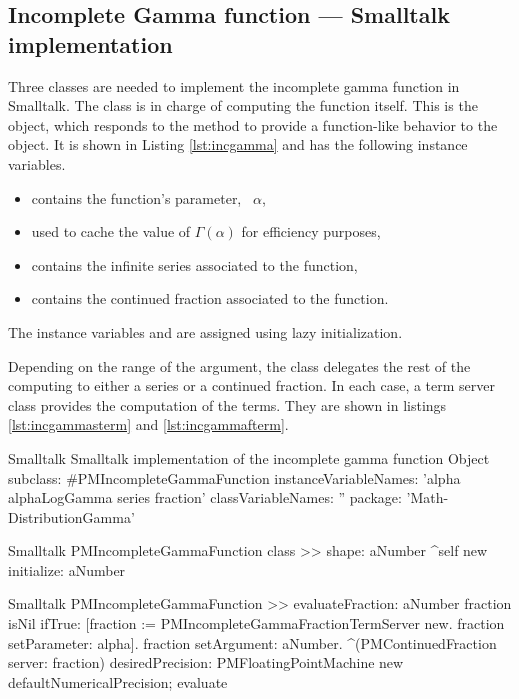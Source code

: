 \subsection{Incomplete Gamma function --- Smalltalk  implementation}
\label{sec:sincgamma}
Three classes are needed to implement the incomplete gamma function in Smalltalk.
The class  is in charge of
computing the function itself. This is the object, which responds
to the method  to provide a function-like behavior to
the object. It is shown in Listing \ref{lst:incgamma} and has the
following instance variables.
\begin{itemize}
\item {} contains the function's parameter, \ie\ $\alpha$,
\item {} used to cache the value of $\Gamma\left(\alpha\right)$ for efficiency
purposes,
\item {} contains the infinite series associated to the function,
\item {} contains the continued fraction  associated to the
function.
\end{itemize}
The instance variables  and  are
assigned using lazy initialization.

Depending on the range of the argument, the class delegates the
rest of the computing to either a series or a continued fraction.
In each case, a term server class provides the computation of the
terms.
They are shown in listings \ref{lst:incgammasterm} and \ref{lst:incgammafterm}.

\begin{listing}[label=lst:incgamma]{Smalltalk}
{Smalltalk implementation of the incomplete gamma function}
Object subclass: #PMIncompleteGammaFunction
   instanceVariableNames: 'alpha alphaLogGamma series fraction'
   classVariableNames: ''
   package: 'Math-DistributionGamma'
\end{listing}

\begin{displaycode}{Smalltalk}
PMIncompleteGammaFunction class >> shape: aNumber
   ^self new initialize: aNumber
\end{displaycode}

\begin{displaycode}{Smalltalk}
PMIncompleteGammaFunction >> evaluateFraction: aNumber
    fraction isNil 
        ifTrue: 
            [fraction := PMIncompleteGammaFractionTermServer new.
            fraction setParameter: alpha].
    fraction setArgument: aNumber.
    ^(PMContinuedFraction server: fraction)
        desiredPrecision: PMFloatingPointMachine new defaultNumericalPrecision;
        evaluate
\end{displaycode}

